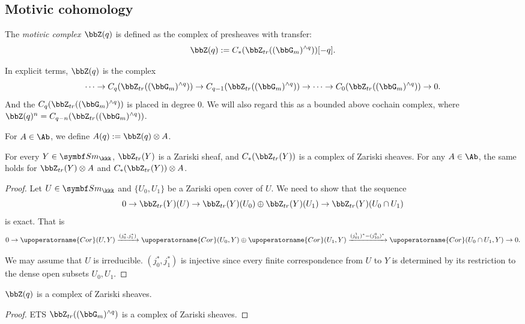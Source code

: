 \subsection{Motivic cohomology}

  \begin{definition}
    The \emph{motivic complex $\bbZ(q)$} is defined as the complex of presheaves with transfer:
    \[ \bbZ(q) := C_*(\bbZ_{tr}((\bbG_m)^{\wedge q}))[-q]. \]
  \end{definition}

  In explicit terms, $\bbZ(q)$ is the complex
  \[ \cdots \to C_q(\bbZ_{tr}((\bbG_m)^{\wedge q})) \to C_{q-1}(\bbZ_{tr}((\bbG_m)^{\wedge q})) \to \cdots \to C_0(\bbZ_{tr}((\bbG_m)^{\wedge q})) \to 0. \]
  And the $C_q(\bbZ_{tr}((\bbG_m)^{\wedge q}))$ is placed in degree $0$.
  We will also regard this as a bounded above cochain complex, where $\bbZ(q)^n = C_{q-n}(\bbZ_{tr}((\bbG_m)^{\wedge q}))$.

  For $A \in \Ab$, we define $A(q) := \bbZ(q) \otimes A$.

  \begin{lemma}
    For every $Y \in \Sm_{\kkk}$, $\bbZ_{tr}(Y)$ is a Zariski sheaf,
    and $C_*(\bbZ_{tr}(Y))$ is a complex of Zariski sheaves.
    For any $A \in \Ab$, the same holds for $\bbZ_{tr}(Y) \otimes A$ and $C_*(\bbZ_{tr}(Y)) \otimes A$.
  \end{lemma}
  \begin{proof}
    Let $U \in \Sm_{\kkk}$ and $\{U_0, U_1\}$ be a Zariski open cover of $U$.
    We need to show that the sequence
    \[ 0 \to \bbZ_{tr}(Y)(U) \to \bbZ_{tr}(Y)(U_0) \oplus \bbZ_{tr}(Y)(U_1) \to \bbZ_{tr}(Y)(U_0 \cap U_1) \]
    is exact.
    That is 
    \[ 0 \to \upoperatorname{Cor}(U, Y) \xrightarrow{(j_0^*, j_1^*)} \upoperatorname{Cor}(U_0, Y) \oplus \upoperatorname{Cor}(U_1, Y) \xrightarrow{(j_{01}^1)^* - (j_{10}^0)^*} \upoperatorname{Cor}(U_0 \cap U_1, Y) \to 0. \]

    We may assume that $U$ is irreducible.
    $(j_0^*, j_1^*)$ is injective since every finite correspondence from $U$ to $Y$ is determined by its restriction to the dense open subsets $U_0, U_1$.

    \Yang{}
  \end{proof}

  \begin{proposition}
    $\bbZ(q)$ is a complex of Zariski sheaves.
  \end{proposition}
  \begin{proof}
    ETS $\bbZ_{tr}((\bbG_m)^{\wedge q})$ is a complex of Zariski sheaves.
    \Yang{}
  \end{proof}


